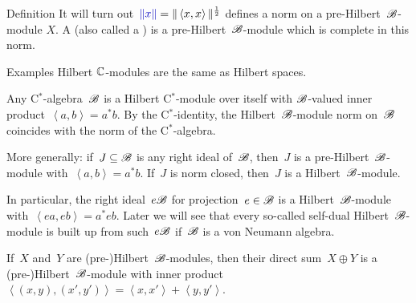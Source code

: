 \documentclass[b]{subfiles}
\begin{document}
\begin{parsec}
\begin{point}{Definition}
It will turn out~$\Define{\| x \|} = \| \left<x,x\right> \|^{\frac{1}{2}}$
        defines a norm on a pre-Hilbert~$\mathscr{B}$-module $X$.
A 
    (also called a )
    is a pre-Hilbert~$\mathscr{B}$-module
    which is complete in this norm.
\end{point}
\begin{point}{Examples}%
Hilbert $\mathbb{C}$-modules are the same as Hilbert spaces.

Any C$^*$-algebra~$\mathscr{B}$ is a Hilbert C$^*$-module over itself
    with $\mathscr{B}$-valued inner product~$\left<a,b\right> = a^*b$.
By the C$^*$-identity, the Hilbert~$\mathscr{B}$-module
    norm on~$\mathscr{B}$ coincides with
    the norm of the C$^*$-algebra.

More generally: if~$J \subseteq \mathscr{B}$
    is any right ideal of~$\mathscr{B}$,
    then~$J$ is a pre-Hilbert~$\mathscr{B}$-module
    with~$\left<a,b\right> = a^*b$.
If~$J$ is norm closed, then~$J$ is a Hilbert~$\mathscr{B}$-module.

In particular, the right ideal~$e \mathscr{B}$ for projection~$e \in \mathscr{B}$
    is a Hilbert~$\mathscr{B}$-module with~$\left<ea,eb\right> = a^*eb$.
Later we will see that every so-called self-dual
    Hilbert~$\mathscr{B}$-module is built up from such~$e \mathscr{B}$
    if~$\mathscr{B}$ is a von Neumann algebra.
    
If~$X$ and~$Y$ are (pre-)Hilbert~$\mathscr{B}$-modules,
    then their direct sum~$X \oplus Y$
    is a (pre-)Hilbert~$\mathscr{B}$-module
    with inner product~$\left<(x,y), (x',y')\right>
                = \left<x,x'\right>+\left<y,y'\right>$.
\end{point}
\end{parsec}
\end{document}
